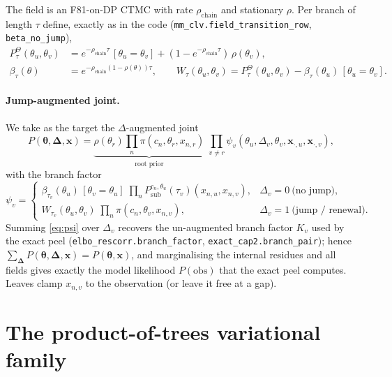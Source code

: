 \documentclass[11pt]{article}
\newcommand{\btheta}{\bm{\theta}}
\newcommand{\bDelta}{\bm{\Delta}}
\newcommand{\bx}{\bm{x}}
\newcommand{\Psub}{P_{\mathrm{sub}}}
\begin{document}
The field is an F81-on-DP CTMC with rate $\rho_{\mathrm{chain}}$ and
stationary $\rho$. Per branch of length $\tau$ define, exactly as in the code
(\texttt{mm\_clv.field\_transition\_row}, \texttt{beta\_no\_jump}),
\begin{equation}
\begin{aligned}
P^{\Theta}_\tau(\theta_u,\theta_v)
  &= e^{-\rho_{\mathrm{chain}}\tau}\,[\theta_u{=}\theta_v]
   + (1-e^{-\rho_{\mathrm{chain}}\tau})\,\rho(\theta_v),\\
\beta_\tau(\theta) &= e^{-\rho_{\mathrm{chain}}(1-\rho(\theta))\tau},\qquad
W_\tau(\theta_u,\theta_v) = P^{\Theta}_\tau(\theta_u,\theta_v)
   - \beta_\tau(\theta_u)\,[\theta_u{=}\theta_v].
\end{aligned}
\label{eq:field-kernels}
\end{equation}

\paragraph{Jump-augmented joint.}
We take as the target the $\Delta$-augmented joint
\begin{equation}
P(\btheta,\bDelta,\bx)
  = \underbrace{\rho(\theta_r)\prod_{n}\pi(c_n,\theta_r,x_{n,r})}_{\text{root prior}}
    \;\prod_{v\neq r}\psi_v(\theta_u,\Delta_v,\theta_v,\bx_{\cdot,u},\bx_{\cdot,v}),
\label{eq:joint}
\end{equation}
with the branch factor
\begin{equation}
\psi_v =
\begin{cases}
\beta_{\tau_v}(\theta_u)\,[\theta_v{=}\theta_u]\;
   \prod_{n}\Psub^{c_n,\theta_u}(\tau_v)(x_{n,u},x_{n,v}), & \Delta_v=0\ \text{(no jump)},\\[4pt]
W_{\tau_v}(\theta_u,\theta_v)\;\prod_{n}\pi(c_n,\theta_v,x_{n,v}), & \Delta_v=1\ \text{(jump / renewal)}.
\end{cases}
\label{eq:psi}
\end{equation}
Summing \eqref{eq:psi} over $\Delta_v$ recovers the un-augmented branch factor
$K_v$ used by the exact peel
(\texttt{elbo\_rescorr.branch\_factor},
\texttt{exact\_cap2.branch\_pair}); hence
$\sum_{\bDelta}P(\btheta,\bDelta,\bx)=P(\btheta,\bx)$, and marginalising the
internal residues and all fields gives exactly the model likelihood
$P(\mathrm{obs})$ that the exact peel computes. Leaves clamp $x_{n,v}$ to the
observation (or leave it free at a gap).

\section{The product-of-trees variational family}
\end{document}
